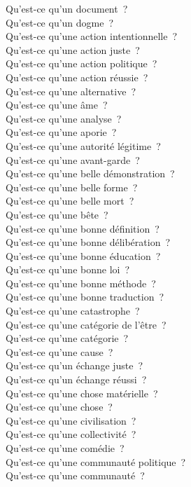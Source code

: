\documentclass[a4paper,12pt]{article}
\begin{document}
Qu'est-ce qu'un document ? \\
Qu'est-ce qu'un dogme ? \\
Qu'est-ce qu'une action intentionnelle ? \\
Qu'est-ce qu'une action juste ? \\
Qu'est-ce qu'une action politique ? \\
Qu'est-ce qu'une action réussie ? \\
Qu'est-ce qu'une alternative ? \\
Qu'est-ce qu'une âme ? \\
Qu'est-ce qu'une analyse ? \\
Qu'est-ce qu'une aporie ? \\
Qu'est-ce qu'une autorité légitime ? \\
Qu'est-ce qu'une avant-garde ? \\
Qu'est-ce qu'une belle démonstration ? \\
Qu'est-ce qu'une belle forme ? \\
Qu'est-ce qu'une belle mort ? \\
Qu'est-ce qu'une bête ? \\
Qu'est-ce qu'une bonne définition ? \\
Qu'est-ce qu'une bonne délibération ? \\
Qu'est-ce qu'une bonne éducation ? \\
Qu'est-ce qu'une bonne loi ? \\
Qu'est-ce qu'une bonne méthode ? \\
Qu'est-ce qu'une bonne traduction ? \\
Qu'est-ce qu'une catastrophe ? \\
Qu'est-ce qu'une catégorie de l'être ? \\
Qu'est-ce qu'une catégorie ? \\
Qu'est-ce qu'une cause ? \\
Qu'est-ce qu'un échange juste ? \\
Qu'est-ce qu'un échange réussi ? \\
Qu'est-ce qu'une chose matérielle ? \\
Qu'est-ce qu'une chose ? \\
Qu'est-ce qu'une civilisation ? \\
Qu'est-ce qu'une collectivité ? \\
Qu'est-ce qu'une comédie ? \\
Qu'est-ce qu'une communauté politique ? \\
Qu'est-ce qu'une communauté ? \\
\end{document}
